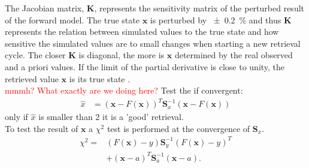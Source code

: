 The Jacobian matrix, $\mathbf{K}$, represents the sensitivity matrix of the perturbed result of the forward model. The true state $\mathbf{x}$ is perturbed by \SI{\pm 0.2}{\percent} and thus $\mathbf{K}$ represents the relation between simulated values to the true state and how sensitive the simulated values are to small changes when starting a new retrieval cycle.   
The closer $\mathbf{K}$ is diagonal, the more is $\mathbf{x}$ determined by the real observed and a priori values. If the limit of the partial derivative is close to unity, the retrieved value $\mathbf{x}$ is its true state \citep{wood_estimation_2011}. 
\\[12pt]
\textcolor{red}{mmmh? What exactly are we doing here?}
Test the if convergent:
\begin{align}
	\hat{x} & = \left( \mathbf{x} - F(\mathbf{x}) \right)^T \mathbf{S}_x^{-1} \left(\mathbf{x} - F(\mathbf{x}) \right)
\end{align}
only if $\hat{x}$ is smaller than \num{2} it is a 'good' retrieval. 
\\
To test the result of $\mathbf{x}$ a $\chi^2$ test is performed at the convergence of $\mathbf{S}_x$.
%
\begin{equation}
\begin{split}
\chi^2 = & \left( F(\mathbf{x}) - y  \right) \mathbf{S}_y^{-1} \left( F(\mathbf{x}) - y \right)^T \\
& + \left( \mathbf{x} - a \right)^T \mathbf{S}_a^{-1} \left( \mathbf{x} - a\right). 
\end{split}
\label{eq:chi}
\end{equation}
